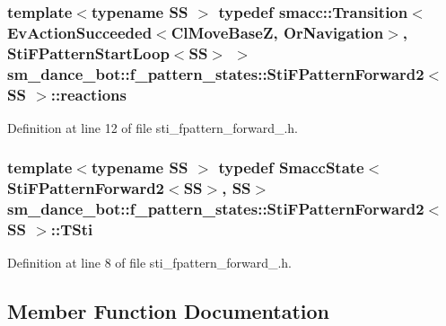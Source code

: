 \subsubsection[{\texorpdfstring{reactions}{reactions}}]{\setlength{\rightskip}{0pt plus 5cm}template$<$typename SS $>$ typedef {\bf smacc\+::\+Transition}$<$Ev\+Action\+Succeeded$<${\bf Cl\+Move\+BaseZ}, {\bf Or\+Navigation}$>$, {\bf Sti\+F\+Pattern\+Start\+Loop}$<$SS$>$ $>$ {\bf sm\+\_\+dance\+\_\+bot\+::f\+\_\+pattern\+\_\+states\+::\+Sti\+F\+Pattern\+Forward2}$<$ SS $>$\+::{\bf reactions}}\hypertarget{structsm__dance__bot_1_1f__pattern__states_1_1StiFPatternForward2_ac4a0678717e5fa1506d64369bd35f09d}{}\label{structsm__dance__bot_1_1f__pattern__states_1_1StiFPatternForward2_ac4a0678717e5fa1506d64369bd35f09d}


Definition at line 12 of file sti\+\_\+fpattern\+\_\+forward\+\_.\+h.

\subsubsection[{\texorpdfstring{T\+Sti}{TSti}}]{\setlength{\rightskip}{0pt plus 5cm}template$<$typename SS $>$ typedef {\bf Smacc\+State}$<${\bf Sti\+F\+Pattern\+Forward2}$<$SS$>$, SS$>$ {\bf sm\+\_\+dance\+\_\+bot\+::f\+\_\+pattern\+\_\+states\+::\+Sti\+F\+Pattern\+Forward2}$<$ SS $>$\+::{\bf T\+Sti}}\hypertarget{structsm__dance__bot_1_1f__pattern__states_1_1StiFPatternForward2_a9579984c93060baa23d437238b0b2f9e}{}\label{structsm__dance__bot_1_1f__pattern__states_1_1StiFPatternForward2_a9579984c93060baa23d437238b0b2f9e}


Definition at line 8 of file sti\+\_\+fpattern\+\_\+forward\+\_.\+h.



\subsection{Member Function Documentation}
